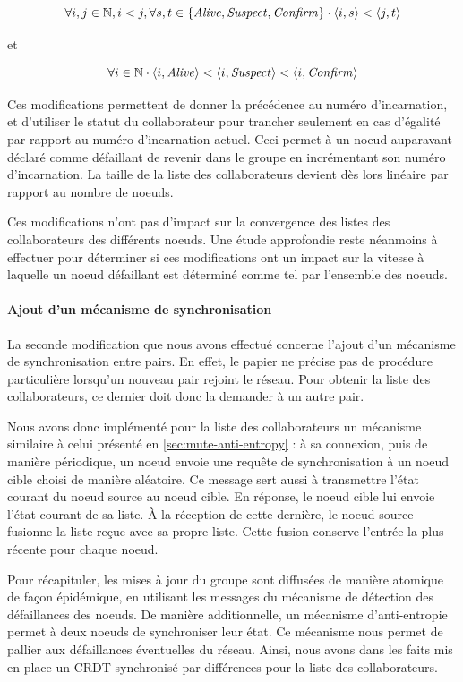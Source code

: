 \[\forall i,j \in \mathbb{N}, i < j, \forall s,t \in \{\mathit{Alive}, \mathit{Suspect}, \mathit{Confirm}\} \cdot \langle i,s \rangle < \langle j,t \rangle\]

et

\[\forall i \in \mathbb{N} \cdot \langle i,\mathit{Alive} \rangle < \langle i,\mathit{Suspect} \rangle < \langle i,\mathit{Confirm} \rangle\]

Ces modifications permettent de donner la précédence au numéro d'incarnation, et d'utiliser le statut du collaborateur pour trancher seulement en cas d'égalité par rapport au numéro d'incarnation actuel.
Ceci permet à un noeud auparavant déclaré comme défaillant de revenir dans le groupe en incrémentant son numéro d'incarnation.
La taille de la liste des collaborateurs devient dès lors linéaire par rapport au nombre de noeuds.

Ces modifications n'ont pas d'impact sur la convergence des listes des collaborateurs des différents noeuds.
Une étude approfondie reste néanmoins à effectuer pour déterminer si ces modifications ont un impact sur la vitesse à laquelle un noeud défaillant est déterminé comme tel par l'ensemble des noeuds.

\paragraph{Ajout d'un mécanisme de synchronisation}

La seconde modification que nous avons effectué concerne l'ajout d'un mécanisme de synchronisation entre pairs.
En effet, le papier ne précise pas de procédure particulière lorsqu'un nouveau pair rejoint le réseau.
Pour obtenir la liste des collaborateurs, ce dernier doit donc la demander à un autre pair.

Nous avons donc implémenté pour la liste des collaborateurs un mécanisme similaire à celui présenté en \autoref{sec:mute-anti-entropy} : à sa connexion, puis de manière périodique, un noeud envoie une requête de synchronisation à un noeud cible choisi de manière aléatoire.
Ce message sert aussi à transmettre l'état courant du noeud source au noeud cible.
En réponse, le noeud cible lui envoie l'état courant de sa liste.
À la réception de cette dernière, le noeud source fusionne la liste reçue avec sa propre liste.
Cette fusion conserve l'entrée la plus récente pour chaque noeud.

Pour récapituler, les mises à jour du groupe sont diffusées de manière atomique de façon épidémique, en utilisant les messages du mécanisme de détection des défaillances des noeuds.
De manière additionnelle, un mécanisme d'anti-entropie permet à deux noeuds de synchroniser leur état.
Ce mécanisme nous permet de pallier aux défaillances éventuelles du réseau.
Ainsi, nous avons dans les faits mis en place un \ac{CRDT} synchronisé par différences pour la liste des collaborateurs.

